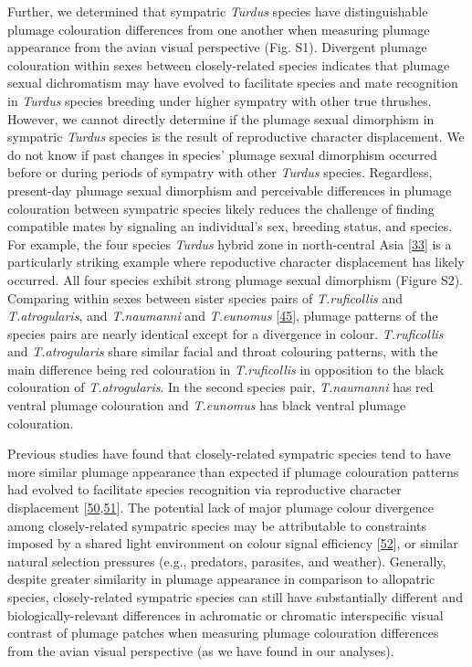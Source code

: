 \documentclass[
  a4paper,
]{article}
\begin{document}
Further, we determined that sympatric \emph{Turdus} species have
distinguishable plumage colouration differences from one another when
measuring plumage appearance from the avian visual perspective (Fig.
S1). Divergent plumage colouration within sexes between closely-related
species indicates that plumage sexual dichromatism may have evolved to
facilitate species and mate recognition in \emph{Turdus} species
breeding under higher sympatry with other true thrushes. However, we
cannot directly determine if the plumage sexual dimorphism in sympatric
\emph{Turdus} species is the result of reproductive character
displacement. We do not know if past changes in species' plumage sexual
dimorphism occurred before or during periods of sympatry with other
\emph{Turdus} species. Regardless, present-day plumage sexual dimorphism
and perceivable differences in plumage colouration between sympatric
species likely reduces the challenge of finding compatible mates by
signaling an individual's sex, breeding status, and species. For
example, the four species \emph{Turdus} hybrid zone in north-central
Asia {[}\protect\hyperlink{ref-mccarthy2006}{33}{]} is a particularly
striking example where repoductive character displacement has likely
occurred. All four species exhibit strong plumage sexual dimorphism
(Figure S2). Comparing within sexes between sister species pairs of
\emph{T.ruficollis} and \emph{T.atrogularis}, and \emph{T.naumanni} and
\emph{T.eunomus} {[}\protect\hyperlink{ref-nylander2008}{45}{]}, plumage
patterns of the species pairs are nearly identical except for a
divergence in colour. \emph{T.ruficollis} and \emph{T.atrogularis} share
similar facial and throat colouring patterns, with the main difference
being red colouration in \emph{T.ruficollis} in opposition to the black
colouration of \emph{T.atrogularis}. In the second species pair,
\emph{T.naumanni} has red ventral plumage colouration and
\emph{T.eunomus} has black ventral plumage colouration.

Previous studies have found that closely-related sympatric species tend
to have more similar plumage appearance than expected if plumage
colouration patterns had evolved to facilitate species recognition via
reproductive character displacement
{[}\protect\hyperlink{ref-simpson2021}{50},\protect\hyperlink{ref-miller2019}{51}{]}.
The potential lack of major plumage colour divergence among
closely-related sympatric species may be attributable to constraints
imposed by a shared light environment on colour signal efficiency
{[}\protect\hyperlink{ref-mcnaught2002}{52}{]}, or similar natural
selection pressures (e.g., predators, parasites, and weather).
Generally, despite greater similarity in plumage appearance in
comparison to allopatric species, closely-related sympatric species can
still have substantially different and biologically-relevant differences
in achromatic or chromatic interspecific visual contrast of plumage
patches when measuring plumage colouration differences from the avian
visual perspective (as we have found in our analyses).
\end{document}
